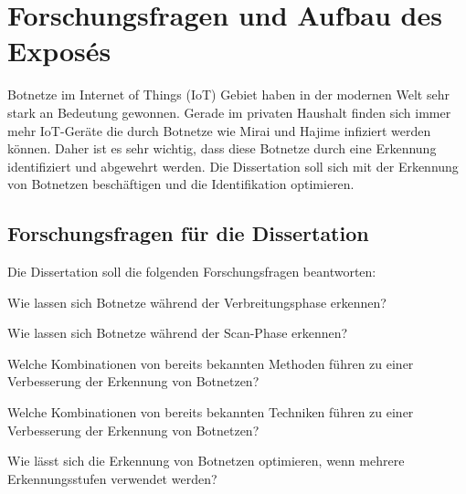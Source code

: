 \section{Forschungsfragen und Aufbau des Exposés}

Botnetze im Internet of Things (IoT) Gebiet haben in der modernen Welt sehr stark an Bedeutung gewonnen. Gerade im privaten 
Haushalt finden sich immer mehr IoT-Geräte die durch Botnetze wie Mirai und Hajime infiziert werden können. Daher ist es 
sehr wichtig, dass diese Botnetze durch eine Erkennung identifiziert und abgewehrt werden. Die Dissertation soll sich mit 
der Erkennung von Botnetzen beschäftigen und die Identifikation optimieren.

\subsection*{Forschungsfragen für die Dissertation}


Die Dissertation soll die folgenden Forschungsfragen beantworten:  

\begin{questions}
    \item Wie lassen sich Botnetze während der Verbreitungsphase erkennen? \label{itm:q1}
    \item Wie lassen sich Botnetze während der Scan-Phase erkennen? \label{itm:q2}
    \item Welche Kombinationen von bereits bekannten Methoden führen zu einer Verbesserung der Erkennung von Botnetzen? \label{itm:q3}
    \item Welche Kombinationen von bereits bekannten Techniken führen zu einer Verbesserung der Erkennung von Botnetzen? \label{itm:q4}
    \item Wie lässt sich die Erkennung von Botnetzen optimieren, wenn mehrere Erkennungsstufen verwendet werden? \label{itm:q5}
\end{questions}

